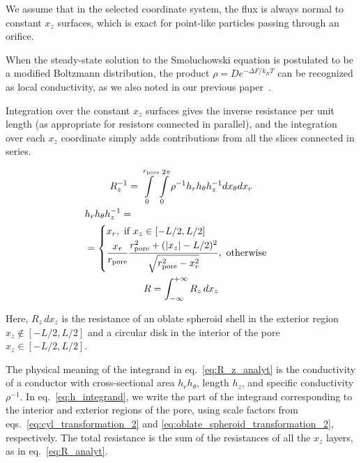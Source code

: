 \documentclass[10pt, a4paper]{article}
\begin{document}
\begin{multicols}{2}
We assume that in the selected coordinate system, the flux is always normal to constant $x_z$ surfaces, which is exact for point-like particles passing through an orifice.

When the steady-state solution to the Smoluchowski equation is postulated to be a modified Boltzmann distribution, the product $\rho = D e^{-\Delta F / k_B T}$ can be recognized as local conductivity, as we also noted in our previous paper~\cite{Laktionov2023}.

Integration over the constant $x_z$ surfaces gives the inverse resistance per unit length (as appropriate for resistors connected in parallel), and the integration over each $x_z$ coordinate simply adds contributions from all the slices connected in series.

\begin{gather}
    \label{eq:R_z_analyt}
    R_z^{-1} = \int\displaylimits_{0}^{r_{\textrm{pore}}} \int\displaylimits_{0}^{2\pi} \rho^{-1} h_r h_{\theta} h_z^{-1} dx_{\theta} dx_r
    \\
    \label{eq:h_integrand}
    \begin{aligned} 
        &h_r h_{\theta} h_z^{-1} = \\ &=
        \begin{cases}
            x_r, \textrm{ if } x_z \in [-L/2,L/2]
            \\[2pt]
            \dfrac{x_r}{r_{\textrm{pore}}}\dfrac{r_{\textrm{pore}}^2 + (|x_z|-L/2)^2}{\sqrt{r_{\textrm{pore}}^2 - x_r^2}}, \textrm{ otherwise}
        \end{cases}
    \end{aligned}
    \\
    \label{eq:R_analyt}
    R = \int_{-\infty}^{+\infty} R_z \, dx_z
\end{gather}

Here, $R_z \, dx_z$ is the resistance of an oblate spheroid shell in the exterior region $x_z \notin [-L/2, L/2]$ and a circular disk in the interior of the pore $x_z \in [-L/2, L/2]$.

The physical meaning of the integrand in eq.~\ref{eq:R_z_analyt} is the conductivity of a conductor with cross-sectional area $h_r h_{\theta}$, length $h_z$, and specific conductivity $\rho^{-1}$.
In eq.~\ref{eq:h_integrand}, we write the part of the integrand corresponding to the interior and exterior regions of the pore, using scale factors from eqs.~\ref{eq:cyl_transformation_2} and \ref{eq:oblate_spheroid_transformation_2}, respectively.
The total resistance is the sum of the resistances of all the $x_z$ layers, as in eq.~\ref{eq:R_analyt}.


\end{multicols}
\end{document}

